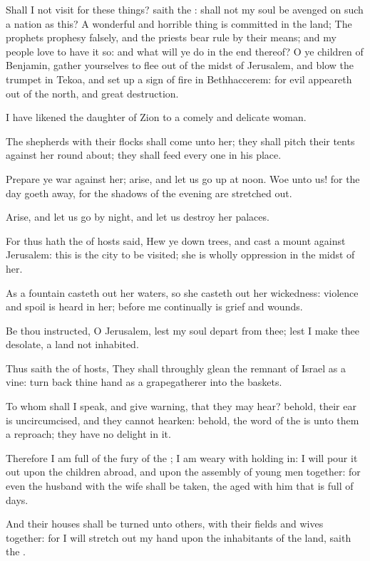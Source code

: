\Verse Shall I not visit for these things? saith the \LORD: shall not my soul be avenged on such a nation as this?  \Verse A wonderful and horrible thing is committed in the land; \Verse The prophets prophesy falsely, and the priests bear rule by their means; and my people love to have it so: and what will ye do in the end thereof?  
\Chapter
\Verse O ye children of Benjamin, gather yourselves to flee out of the midst of Jerusalem, and blow the trumpet in Tekoa, and set up a sign of fire in Bethhaccerem: for evil appeareth out of the north, and great destruction.

\Verse I have likened the daughter of Zion to a comely and delicate woman.

\Verse The shepherds with their flocks shall come unto her; they shall pitch their tents against her round about; they shall feed every one in his place.

\Verse Prepare ye war against her; arise, and let us go up at noon. Woe unto us! for the day goeth away, for the shadows of the evening are stretched out.

\Verse Arise, and let us go by night, and let us destroy her palaces.

\Verse For thus hath the \LORD of hosts said, Hew ye down trees, and cast a mount against Jerusalem: this is the city to be visited; she is wholly oppression in the midst of her.

\Verse As a fountain casteth out her waters, so she casteth out her wickedness: violence and spoil is heard in her; before me continually is grief and wounds.

\Verse Be thou instructed, O Jerusalem, lest my soul depart from thee; lest I make thee desolate, a land not inhabited.

\Verse Thus saith the \LORD of hosts, They shall throughly glean the remnant of Israel as a vine: turn back thine hand as a grapegatherer into the baskets.

\Verse To whom shall I speak, and give warning, that they may hear?  behold, their ear is uncircumcised, and they cannot hearken: behold, the word of the \LORD is unto them a reproach; they have no delight in it.

\Verse Therefore I am full of the fury of the \LORD; I am weary with holding in: I will pour it out upon the children abroad, and upon the assembly of young men together: for even the husband with the wife shall be taken, the aged with him that is full of days.

\Verse And their houses shall be turned unto others, with their fields and wives together: for I will stretch out my hand upon the inhabitants of the land, saith the \LORD.

